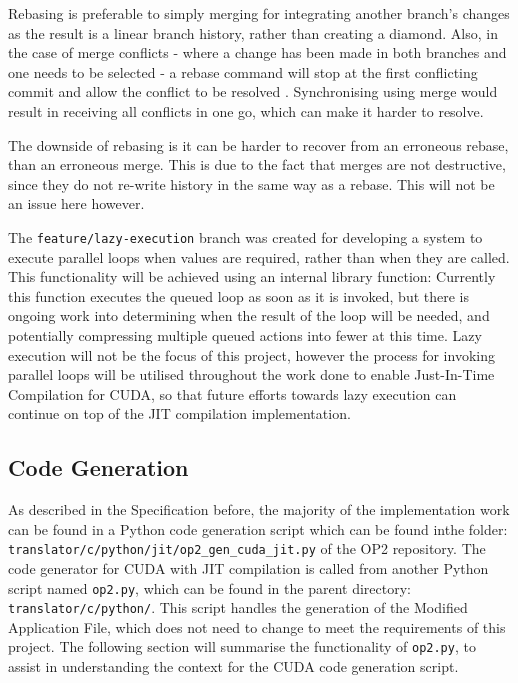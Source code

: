 \par
Rebasing is preferable to simply merging for integrating another branch's changes as the result is a linear branch history, rather than creating a diamond. Also, in the case of merge conflicts - where a change has been made in both branches and one needs to be selected - a rebase command will stop at the first conflicting commit and allow the conflict to be resolved \cite{rebase-doc}. Synchronising using merge would result in receiving all conflicts in one go, which can make it harder to resolve.
\par
The downside of rebasing is it can be harder to recover from an erroneous rebase, than an erroneous merge. This is due to the fact that merges are not destructive, since they do not re-write history in the same way as a rebase. This will not be an issue here however.
\par
The \verb|feature/lazy-execution| branch was created for developing a system to execute parallel loops when values are required, rather than when they are called. This functionality will be achieved using an internal library function:
Currently this function executes the queued loop as soon as it is invoked, but there is ongoing work into determining when the result of the loop will be needed, and potentially compressing multiple queued actions into fewer at this time. Lazy execution will not be the focus of this project, however the process for invoking parallel loops will be utilised throughout the work done to enable Just-In-Time Compilation for CUDA, so that future efforts towards lazy execution can continue on top of the JIT compilation implementation.

\subsection{Code Generation}
\label{ss:codegen}
As described in the Specification before, the majority of the implementation work can be found in a Python code generation script which can be found inthe folder: \verb|translator/c/python/jit/op2_gen_cuda_jit.py| of the OP2 repository.
\noindent The code generator for CUDA with JIT compilation is called from another Python script named \verb|op2.py|, which can be found in the parent directory: \verb|translator/c/python/|. This script handles the generation of the Modified Application File, which does not need to change to meet the requirements of this project. The following section will summarise the functionality of \verb|op2.py|, to assist in understanding the context for the CUDA code generation script.


